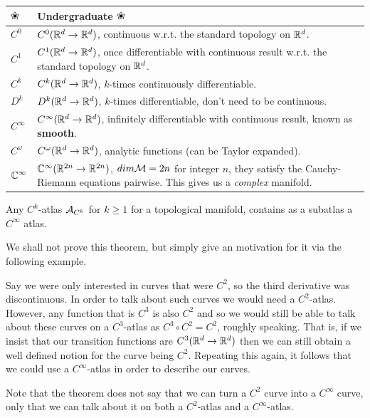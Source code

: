 \begin{center}
	\begin{tabular}{@{} p{2cm}p{10cm}@{}}
		\toprule
		$\flower$ & Undergraduate $\flower$ \\
		\midrule 
		$C^0$ & $C^0(\mathbb{R}^d\to\mathbb{R}^d)$, continuous w.r.t. the standard topology on $\mathbb{R}^d$. \\
		$C^1$ & $C^1(\mathbb{R}^d\to\mathbb{R}^d)$, once differentiable with continuous result w.r.t. the standard topology on $\mathbb{R}^d$. \\
		$C^k$ & $C^k(\mathbb{R}^d\to\mathbb{R}^d)$, $k$-times continuously differentiable. \\
		$D^k$ & $D^k(\mathbb{R}^d\to\mathbb{R}^d)$, $k$-times  differentiable, don't need to be continuous. \\
		$C^{\infty}$ & $C^{\infty}(\mathbb{R}^d\to\mathbb{R}^d)$, infinitely differentiable with continuous result, known as \textbf{smooth}. \\
		$C^{\omega}$ & $C^{\omega}(\mathbb{R}^d\to\mathbb{R}^d)$, analytic functions (can be Taylor expanded). \\
		$\mathbb{C}^{\infty}$ & $\mathbb{C}^{\infty}(\mathbb{R}^{2n}\to\mathbb{R}^{2n})$, $dim \mathcal{M} = 2n$ for integer $n$, they satisfy the Cauchy-Riemann equations pairwise. This gives us a \textit{complex} manifold. \\
		\bottomrule
	\end{tabular}
\end{center}

    Any $C^k$-atlas $\mathcal{A}_{C^k}$ for $k\geq 1$ for a topological manifold, contains as a subatlas a $C^{\infty}$ atlas. 
\et 

We shall not prove this theorem, but simply give an motivation for it via the following example. 

\bex 
    Say we were only interested in curves that were $C^2$, so the third derivative was discontinuous. In order to talk about such curves we would need a $C^2$-atlas. However, any function that is $C^3$ is also $C^2$ and so we would still be able to talk about these curves on a $C^3$-atlas as $C^3\circ C^2 = C^2$, roughly speaking. That is, if we insist that our transition functions are $C^3(\mathbb{R}^d\to\mathbb{R}^d)$ then we can still obtain a well defined notion for the curve being $C^2$. Repeating this again, it follows that we could use a $C^{\infty}$-atlas in order to describe our curves. 
    
    Note that the theorem does not say that we can turn a $C^2$ curve into a $C^{\infty}$ curve, only that we can talk about it on both a $C^2$-atlas and a $C^{\infty}$-atlas. 
\eex 

